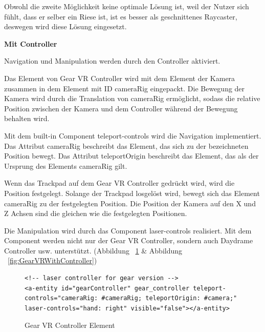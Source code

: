   Obwohl die zweite Möglichkeit keine optimale Lösung ist, weil der Nutzer sich fühlt, dass er selber ein Riese ist, ist es besser als geschnittenes Raycaster, deswegen wird diese Lösung eingesetzt. 
  
  \vspace{1em}
  \noindent
  \textbf{Mit Controller}
  \vspace{1em}
  
  \noindent
  Navigation und Manipulation werden durch den Controller aktiviert.
  
  Das Element von Gear VR Controller wird mit dem Element der Kamera zusammen in dem Element mit ID {\selectfont cameraRig} eingepackt. Die Bewegung der Kamera wird durch die Translation von {\selectfont cameraRig} ermöglicht, sodass die relative Position zwischen der Kamera und dem Controller während der Bewegung behalten wird.
  
  Mit dem built-in Component {\selectfont teleport-controls} wird die Navigation implementiert. Das Attribut {\selectfont cameraRig} beschreibt das Element, das sich zu der bezeichneten Position bewegt. Das Attribut {\selectfont teleportOrigin} beschreibt das Element, das als der Ursprung des Elements {\selectfont cameraRig} gilt.
  
  Wenn das Trackpad auf dem Gear VR Controller gedrückt wird, wird die Position festgelegt. Solange der Trackpad losgelöst wird, bewegt sich das Element {\selectfont cameraRig} zu der festgelegten Position. Die Position der Kamera auf den X und Z Achsen sind die gleichen wie die festgelegten Positionen.
  
  Die Manipulation wird durch das Component {\selectfont laser-controls} realisiert. Mit dem Component werden nicht nur der Gear VR Controller, sondern auch Daydrame Controller usw. unterstützt. (Abbildung ~\ref{fig:GearVRControllerElement} \& Abbildung ~\ref{fig:GearVRWithController})
  
\begin{figure}[ht]
\vspace*{1em}
\centering
\caption[Gear VR Controller Element]{Gear VR Controller Element}
\begin{lstlisting}[language=HTML5, style=htmlcssjs]
<!-- laser controller for gear version -->
<a-entity id="gearController" gear_controller teleport-controls="cameraRig: #cameraRig; teleportOrigin: #camera;" laser-controls="hand: right" visible="false"></a-entity>
\end{lstlisting}
\label{fig:GearVRControllerElement} 
\end{figure}
  
